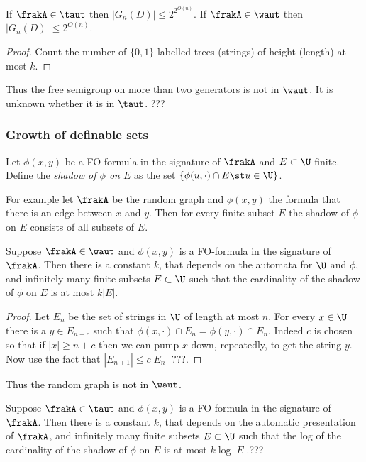\begin{corollary}
If $\frakA \in \taut$ then $|G_n(D)| \leq 2^{2^{O(n)}}$. If $\frakA \in \waut$ then 
$|G_n(D)| \leq 2^{O(n)}$.
\end{corollary}
\begin{proof}
Count the number of $\{0,1\}$-labelled trees (strings) of height (length) at most $k$.
\end{proof}

Thus the free semigroup on more than two generators is not in $\waut$. It is unknown whether it is in $\taut$. ???

\subsubsection*{Growth of definable sets}

\begin{definition}
Let $\phi(x,y)$ be a FO-formula in the signature of $\frakA$ and $E \subset \U$ finite. 
Define the {\em shadow of $\phi$ on $E$} as the set $\{\phi(u,\cdot) \cap E \st u \in \U\}$.
\end{definition}

For example let $\frakA$ be the random graph and $\phi(x,y)$ the formula that there is an edge between $x$ and $y$.
Then for every finite subset $E$ the shadow of $\phi$ on $E$ consists of all subsets of $E$.

\begin{proposition}
Suppose $\frakA \in \waut$ and $\phi(x,y)$ is a FO-formula in the signature of $\frakA$.
Then there is a constant $k$, 
that depends on the automata for $\U$ and $\phi$, and infinitely many finite subsets $E \subset \U$ such
that the cardinality of the shadow of $\phi$ on $E$ is at most $k|E|$.
\end{proposition}

\begin{proof}
Let $E_n$ be the set of strings in $\U$ of length at most $n$. For every $x \in \U$ there is a 
$y \in E_{n+c}$ such that $\phi(x,\cdot) \cap E_n = \phi(y,\cdot) \cap E_n$. Indeed $c$ is chosen so that
if $|x| \geq n+c$ then we can pump $x$ down, repeatedly, to get the string $y$.  Now use the fact that
$|E_{n+1}| \leq c|E_n|$ ???.
\end{proof}

Thus the random graph is not in $\waut$.

\begin{proposition}
Suppose $\frakA \in \taut$ and $\phi(x,y)$ is a FO-formula in the signature of $\frakA$.
Then there is a constant $k$, 
that depends on the automatic presentation of $\frakA$, and infinitely many finite subsets $E \subset \U$ such
that the log of the cardinality of the shadow of $\phi$ on $E$ is at most $k\log|E|$.??? 
\end{proposition}

